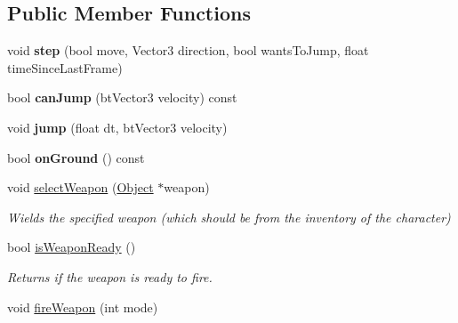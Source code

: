 \subsection*{\-Public \-Member \-Functions}
\begin{DoxyCompactItemize}
\item 
\hypertarget{classComponentCharacterController_ad45697744704ca863df0cf86159a3e11}{
void {\bfseries step} (bool move, \-Vector3 direction, bool wants\-To\-Jump, float time\-Since\-Last\-Frame)}
\label{dd/d8a/classComponentCharacterController_ad45697744704ca863df0cf86159a3e11}

\item 
\hypertarget{classComponentCharacterController_a1f44d8c1ec615c93badf13313cc2e622}{
bool {\bfseries can\-Jump} (bt\-Vector3 velocity) const }
\label{dd/d8a/classComponentCharacterController_a1f44d8c1ec615c93badf13313cc2e622}

\item 
\hypertarget{classComponentCharacterController_a7bf8e9da6119301c246d09d6998e2cf0}{
void {\bfseries jump} (float dt, bt\-Vector3 velocity)}
\label{dd/d8a/classComponentCharacterController_a7bf8e9da6119301c246d09d6998e2cf0}

\item 
\hypertarget{classComponentCharacterController_abff2071738bd07556e8a21be48d1031e}{
bool {\bfseries on\-Ground} () const }
\label{dd/d8a/classComponentCharacterController_abff2071738bd07556e8a21be48d1031e}

\item 
\hypertarget{classComponentCharacterController_a8194209897515fceaa01672748a05470}{
void \hyperlink{classComponentCharacterController_a8194209897515fceaa01672748a05470}{select\-Weapon} (\hyperlink{classObject}{\-Object} $\ast$weapon)}
\label{dd/d8a/classComponentCharacterController_a8194209897515fceaa01672748a05470}

\begin{DoxyCompactList}\small\item\em \-Wields the specified weapon (which should be from the inventory of the character) \end{DoxyCompactList}\item 
\hypertarget{classComponentCharacterController_a626108369beb5d03ae395d8c424a5578}{
bool \hyperlink{classComponentCharacterController_a626108369beb5d03ae395d8c424a5578}{is\-Weapon\-Ready} ()}
\label{dd/d8a/classComponentCharacterController_a626108369beb5d03ae395d8c424a5578}

\begin{DoxyCompactList}\small\item\em \-Returns if the weapon is ready to fire. \end{DoxyCompactList}\item 
\hypertarget{classComponentCharacterController_a3b3fb59c78ecdcaa84f34ff23bee1695}{
void \hyperlink{classComponentCharacterController_a3b3fb59c78ecdcaa84f34ff23bee1695}{fire\-Weapon} (int mode)}
\label{dd/d8a/classComponentCharacterController_a3b3fb59c78ecdcaa84f34ff23bee1695}


\end{DoxyCompactItemize}

